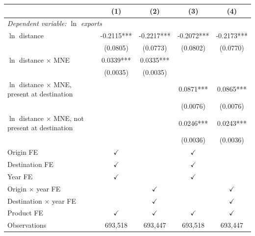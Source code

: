 \begin{tabular}{lcccc} \hline
 & (1) & (2) & (3) & (4) \\ \hline
\multicolumn{5}{l}{\textit{Dependent variable: $\ln$ exports}} \\
$\ln$ distance & -0.2115*** & -0.2217*** & -0.2072*** & -0.2173*** \\
 & (0.0805) & (0.0773) & (0.0802) & (0.0770) \\
$\ln$ distance $\times$ MNE & 0.0339*** & 0.0335*** &  &  \\
 & (0.0035) & (0.0035) &  &  \\
$\ln$ distance $\times$ MNE, present at destination &  &  & 0.0871*** & 0.0865*** \\
 &  &  & (0.0076) & (0.0076) \\
$\ln$ distance $\times$ MNE, not present at destination &  &  & 0.0246*** & 0.0243*** \\
 &  &  & (0.0036) & (0.0036) \\
\hline
Origin FE & $\checkmark$ &  & $\checkmark$ &  \\
Destination FE & $\checkmark$ &  & $\checkmark$ &  \\
Year FE & $\checkmark$ &  & $\checkmark$ &  \\
Origin $\times$ year FE &  & $\checkmark$ &  & $\checkmark$ \\
Destination $\times$ year FE &  & $\checkmark$ &  & $\checkmark$ \\
Product FE & $\checkmark$ & $\checkmark$ & $\checkmark$ & $\checkmark$ \\
Observations & 693,518 & 693,447 & 693,518 & 693,447 \\
\hline
\end{tabular}

